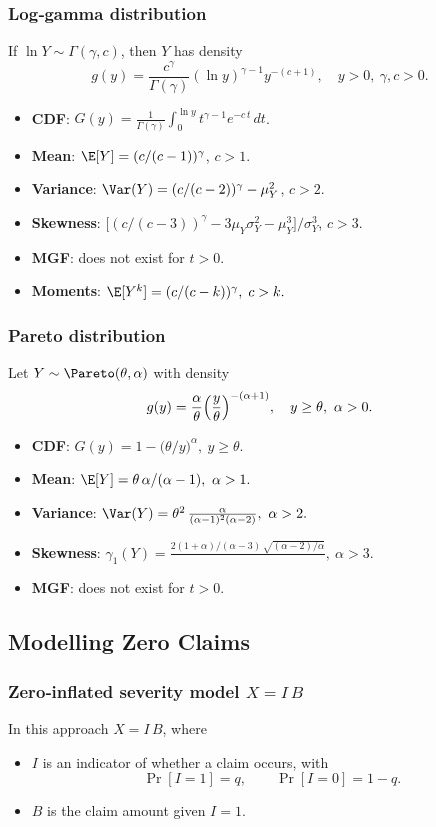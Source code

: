 \documentclass[11pt]{article}
\newcommand{\noi}{\noindent}
\begin{document}
\subsubsection{Log‐gamma distribution}
\noi If \(\ln Y\sim\Gamma(\gamma,c)\), then \(Y\) has density
\[
g(y)=\frac{c^\gamma}{\Gamma(\gamma)}(\ln y)^{\gamma-1}y^{-(c+1)},
\quad y>0,\ \gamma,c>0.
\]
\begin{itemize}
  \item \textbf{CDF}: 
  \(\displaystyle
    G(y)
    =\frac{1}{\Gamma(\gamma)}
     \int_{0}^{\ln y} t^{\gamma-1}e^{-c\,t}\,dt\).
  \item \textbf{Mean}: \(\E[Y]=(c/(c-1))^\gamma\), \(c>1\).
  \item \textbf{Variance}: \(\Var(Y)=(c/(c-2))^\gamma -\mu_Y^2\), \(c>2\).
  \item \textbf{Skewness}: 
    \(\bigl[(c/(c-3))^\gamma -3\mu_Y\sigma_Y^2-\mu_Y^3\bigr]/\sigma_Y^3\), \(c>3\).
  \item \textbf{MGF}: does not exist for \(t>0\).
  \item \textbf{Moments}: \(\E[Y^k]=(c/(c-k))^\gamma,\;c>k.\)
\end{itemize}

\subsubsection{Pareto distribution}
\noi Let \(Y\sim\Pareto(\theta,\alpha)\) with density
\[
g(y)=\frac{\alpha}{\theta}\Bigl(\frac{y}{\theta}\Bigr)^{-(\alpha+1)},
\quad y\ge\theta,\ \alpha>0.
\]
\begin{itemize}
  \item \textbf{CDF}: \(G(y)=1-\bigl(\theta/y\bigr)^{\alpha},\ y\ge\theta.\)
  \item \textbf{Mean}: \(\E[Y]=\theta\,\alpha/(\alpha-1),\ \alpha>1.\)
  \item \textbf{Variance}: \(\Var(Y)=\theta^2\,\frac{\alpha}{(\alpha-1)^2(\alpha-2)},\ \alpha>2.\)
  \item \textbf{Skewness}: 
    \(\gamma_1(Y)
    =\frac{2(1+\alpha)/(\alpha-3)\,\sqrt{(\alpha-2)/\alpha}}{\,},\ \alpha>3.\)
  \item \textbf{MGF}: does not exist for \(t>0\).
\end{itemize}

\subsection{Modelling Zero Claims}
\subsubsection{Zero‐inflated severity model \(X = I\,B\)}
\noi In this approach \(X=I\,B\), where
\begin{itemize}
  \item \(I\) is an indicator of whether a claim occurs, with
    \[
      \Pr[I=1]=q,\qquad \Pr[I=0]=1-q.
    \]
  \item \(B\) is the claim amount given \(I=1\).
\end{itemize}
\end{document}
